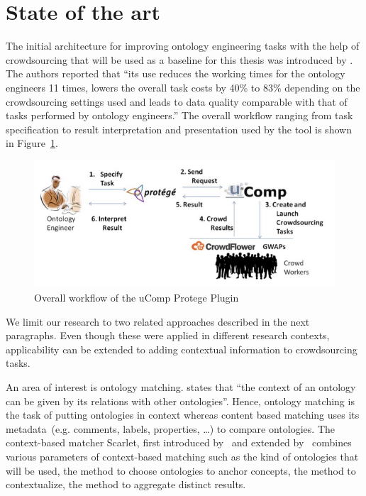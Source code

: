 \documentclass[12pt, notitlepage]{article}
\begin{document}
\section{State of the art}

The initial architecture for improving ontology engineering tasks with the help of crowdsourcing that will be used as a baseline for this thesis was introduced by \citet{wohlgenannt2016crowd}. The authors reported that \enquote{its use reduces the working times for the ontology engineers 11 times, lowers the overall task costs by 40\% to 83\% depending on the crowdsourcing settings used and leads to data quality comparable with that of tasks performed by ontology engineers.} The overall workflow ranging from task specification to result interpretation and presentation used by the tool is shown in Figure~\ref{fig:ucomp_workflow}.
\begin{figure}[H]
	 \includegraphics[width=\textwidth]{graphics/ucomp_workflow}
	 \caption{Overall workflow of the uComp Protege Plugin~\cite{wohlgenannt2016crowd}}\label{fig:ucomp_workflow}
\end{figure}

We limit our research to two related approaches described in the next paragraphs. Even though these were applied in different research contexts, applicability can be extended to adding contextual information to crowdsourcing tasks.

An area of interest is ontology matching. \citet{hoffmann2010context} states that \enquote{the context of an ontology can be given by its relations with other ontologies}. Hence, ontology matching is the task of putting ontologies in context whereas content based matching uses its metadata~(e.g. comments, labels, properties, \ldots) to compare ontologies. The context-based matcher Scarlet, first introduced by~\citet{sabou2008scarlet} and extended by~\citet{hoffmann2010context} combines various parameters of context-based matching such as the kind of ontologies that will be used, the method to choose ontologies to anchor concepts, the method to contextualize, the method to aggregate distinct results. 
\end{document}
